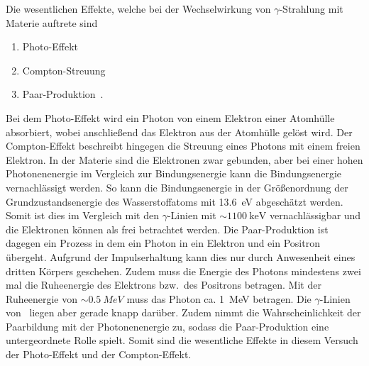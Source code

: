 Die wesentlichen Effekte, welche bei der Wechselwirkung von $\gamma$-Strahlung
mit Materie auftrete sind
\begin{enumerate}
  \item Photo-Effekt
  \item Compton-Streuung
  \item Paar-Produktion~.
\end{enumerate}
Bei dem Photo-Effekt wird ein Photon von einem Elektron einer Atomhülle
absorbiert, wobei anschließend das Elektron aus der Atomhülle gelöst wird.
Der Compton-Effekt beschreibt hingegen die Streuung eines Photons mit einem
freien Elektron. In der Materie sind die Elektronen zwar gebunden, aber bei
einer hohen Photonenenergie im Vergleich zur Bindungsenergie kann die
Bindungsenergie vernachlässigt werden. So kann die Bindungsenergie in der
Größenordnung der Grundzustandsenergie des Wasserstoffatoms mit \SI{13.6}{\eV}
abgeschätzt werden. Somit ist dies im Vergleich mit den $\gamma$-Linien mit
$\sim \SI{1100}{\keV}$ vernachlässigbar und die Elektronen können als frei
betrachtet werden.
Die Paar-Produktion ist dagegen ein Prozess in dem ein Photon in ein Elektron
und ein Positron übergeht. Aufgrund der Impulserhaltung kann dies nur durch
Anwesenheit eines dritten Körpers geschehen. Zudem muss die Energie des Photons
mindestens zwei mal die Ruheenergie des Elektrons bzw.~des Positrons betragen.
Mit der Ruheenergie von $\sim \SI{0.5}{MeV}$ muss das Photon ca. \SI{1}{\MeV}
betragen. Die $\gamma$-Linien von \Co~liegen aber gerade knapp darüber.
Zudem nimmt die Wahrscheinlichkeit der Paarbildung mit der Photonenenergie zu,
sodass die Paar-Produktion eine untergeordnete Rolle spielt.
Somit sind die wesentliche Effekte in diesem Versuch der Photo-Effekt und
der Compton-Effekt.

